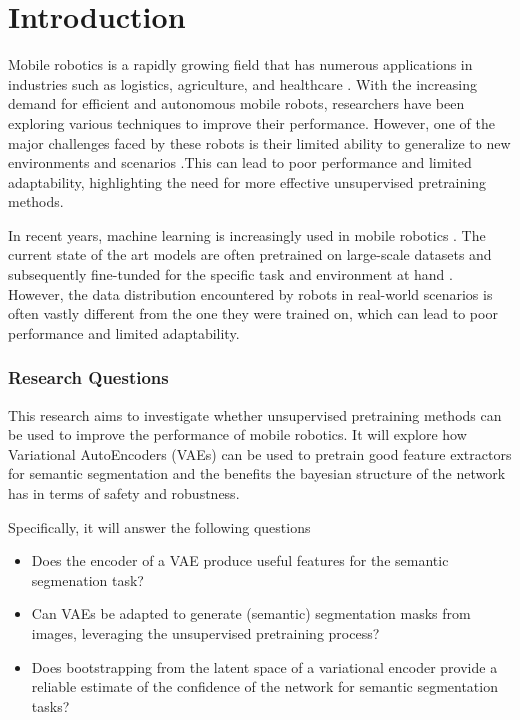 \chapter{Introduction}\label{chapter:introduction}

Mobile robotics is a rapidly growing field that has numerous applications in industries such as logistics, agriculture, and healthcare \cite{cognominal2021evolving,kebede2024review,clark2023amazon}. With the increasing demand for efficient and autonomous mobile robots, researchers have been exploring various techniques to improve their performance. However, one of the major challenges faced by these robots is their limited ability to generalize to new environments and scenarios \cite{alatise2020review}.This can lead to poor performance and limited adaptability, highlighting the need for more effective unsupervised pretraining methods.

In recent years, machine learning is increasingly used in mobile robotics \cite{almeida2018localization,yu2018ds}. The current state of the art models are often pretrained on large-scale datasets and subsequently fine-tunded for the specific task and environment at hand \cite{Goodfellow-et-al-2016}. However, the data distribution encountered by robots in real-world scenarios is often vastly different from the one they were trained on, which can lead to poor performance and limited adaptability.

\subsection*{Research Questions}
This research aims to investigate whether unsupervised pretraining methods can be used to improve the performance of mobile robotics. It will explore how Variational AutoEncoders (VAEs) \cite{kingma2014autoencodingvariationalbayes} can be used to pretrain good feature extractors for semantic segmentation and the benefits the bayesian structure of the network has in terms of safety and robustness.

Specifically, it will answer the following questions
\begin{itemize}
    \item Does the encoder of a VAE produce useful features for the semantic segmenation task?
    \item Can VAEs be adapted to generate (semantic) segmentation masks from images, leveraging the unsupervised pretraining process?
    \item Does bootstrapping from the latent space of a variational encoder provide a reliable estimate of the confidence of the network for semantic segmentation tasks?
\end{itemize}


